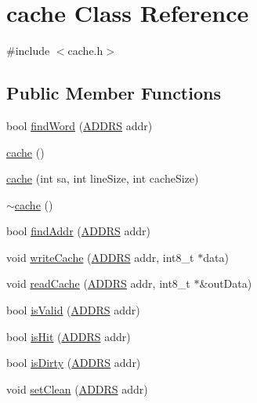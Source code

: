 \hypertarget{classcache}{
\section{cache Class Reference}
\label{classcache}
}


{\ttfamily \#include $<$cache.h$>$}

\subsection*{Public Member Functions}
\begin{DoxyCompactItemize}
\item 
bool \hyperlink{classcache_a93fb585ef6a736b9831dc21bb193d96f}{findWord} (\hyperlink{global_2global_8h_a7ea74bb9ffd2e4d41550ae2383dd25bc}{ADDRS} addr)
\item 
\hyperlink{classcache_a13bdadd498ed51df4b1a8431ddf700bd}{cache} ()
\item 
\hyperlink{classcache_a44b0c0aa85b39105f5c360ebcf3a4495}{cache} (int sa, int lineSize, int cacheSize)
\item 
\hyperlink{classcache_a4a4f36a52e9ad046af986ce9095616a5}{$\sim$cache} ()
\item 
bool \hyperlink{classcache_ab524f6f2badf04b54b438d95f154fadf}{findAddr} (\hyperlink{global_2global_8h_a7ea74bb9ffd2e4d41550ae2383dd25bc}{ADDRS} addr)
\item 
void \hyperlink{classcache_ab3b31a1d08bf67d960705e8b7e631546}{writeCache} (\hyperlink{global_2global_8h_a7ea74bb9ffd2e4d41550ae2383dd25bc}{ADDRS} addr, int8\_\-t $\ast$data)
\item 
void \hyperlink{classcache_a8543792b7d9060b3701cb1b67d417b44}{readCache} (\hyperlink{global_2global_8h_a7ea74bb9ffd2e4d41550ae2383dd25bc}{ADDRS} addr, int8\_\-t $\ast$\&outData)
\item 
bool \hyperlink{classcache_a2c8e87daacbe31a4780e06db9d571742}{isValid} (\hyperlink{global_2global_8h_a7ea74bb9ffd2e4d41550ae2383dd25bc}{ADDRS} addr)
\item 
bool \hyperlink{classcache_af39bc5f11fbca905873c840a8dcfb9b9}{isHit} (\hyperlink{global_2global_8h_a7ea74bb9ffd2e4d41550ae2383dd25bc}{ADDRS} addr)
\item 
bool \hyperlink{classcache_ab1edc7f06068472ac043cbd293ae83ea}{isDirty} (\hyperlink{global_2global_8h_a7ea74bb9ffd2e4d41550ae2383dd25bc}{ADDRS} addr)
\item 
void \hyperlink{classcache_a88790ea3a4e3583eaae71a365e9568e7}{setClean} (\hyperlink{global_2global_8h_a7ea74bb9ffd2e4d41550ae2383dd25bc}{ADDRS} addr)

\end{DoxyCompactItemize}
